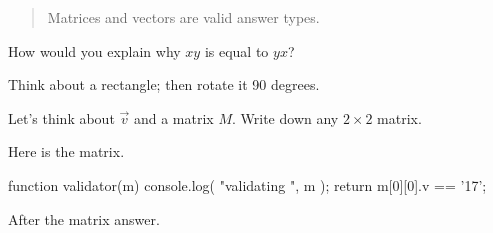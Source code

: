 \documentclass{ximera}
\begin{document}
\begin{abstract}
  Matrices and vectors are valid answer types.
\end{abstract}

How would you explain why $xy$ is equal to $yx$?
\begin{free-response}
  Think about a rectangle; then rotate it 90 degrees.
\end{free-response}

\begin{exercise}
  Let's think about $\vec{v}$ and a matrix $M$.  Write down any $2
  \times 2$ matrix.

\begin{solution}
  Here is the matrix.

\begin{matrix-answer}[name=M]
  function validator(m) {
    console.log( "validating ", m );
    return m[0][0].v == '17';
  }
\end{matrix-answer}

After the matrix answer.

\end{solution}

\end{exercise}
\end{document}
